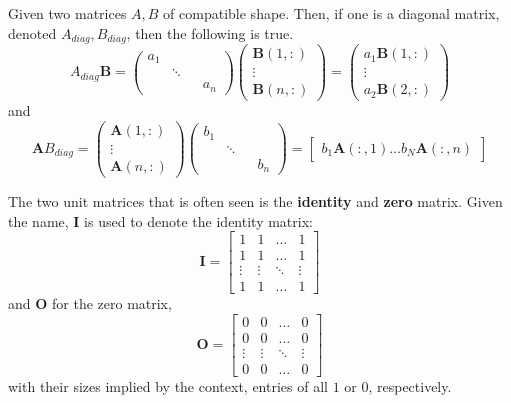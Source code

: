 \begin{proposition}
    Given two matrices $A,B$ of compatible shape. Then, if one is a diagonal matrix, denoted $A_{diag},B_{diag}$, then the following is true. 
    \begin{equation}
        A_{diag}\mathbf{B}=\begin{pmatrix}
a_{1}  &  &  &  \\
 & \ddots  &  &  \\
 &  &  & a_{n}
\end{pmatrix}\begin{pmatrix}
\mathbf{B}(1,:) \\
\vdots \\
\mathbf{B}(n,:)
\end{pmatrix}=\begin{pmatrix}
a_{1}\mathbf{B}(1,:) \\
\vdots \\
a_{2}\mathbf{B}(2,:)
\end{pmatrix}
    \end{equation}
and 
\begin{equation}
    \mathbf{A}B_{diag}=\begin{pmatrix}
\mathbf{A}(1,:) \\
\vdots \\
\mathbf{A}(n,:)
\end{pmatrix}\begin{pmatrix}
b_{1}  &  &  &  \\
 & \ddots  &  &  \\
 &  &  & b_{n}
\end{pmatrix}=\begin{bmatrix}
b_{1}\mathbf{A}(:,1)\dots b_{N}\mathbf{A}(:,n)
\end{bmatrix}
\end{equation}
\end{proposition}

The two unit matrices that is often seen is the \textbf{identity} and \textbf{zero} matrix. Given the name, $\mathbf{I}$ is used to denote the identity matrix: $$\mathbf{I}=\begin{bmatrix}
1 & 1 & \dots & 1 \\
1 & 1 & \dots & 1 \\
\vdots  & \vdots  & \ddots  & \vdots \\
1 & 1  & \dots & 1
\end{bmatrix}$$
and $\mathbf{O}$ for the zero matrix, 
$$\mathbf{O}=\begin{bmatrix}
0 & 0 & \dots & 0 \\
0 & 0 & \dots & 0 \\
\vdots  & \vdots  & \ddots  & \vdots \\
0 & 0  & \dots & 0
\end{bmatrix}$$
with their sizes implied by the context, entries of all $1$ or $0$, respectively. 

